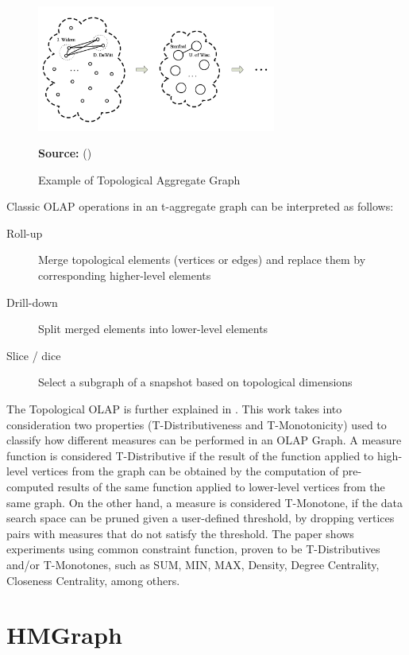 \begin{figure}[ht]
\centering
\caption{Example of Topological Aggregate Graph}
\label{fig:figure16}
\includegraphics[width=0.7\textwidth]{images/t_aggregated_graph_example.png}
\par\medskip\ABNTEXfontereduzida\selectfont\textbf{Source:} \citeauthor{Chen2008} (\citeyear{Chen2008}) \par\medskip
\end{figure}

Classic OLAP operations in an t-aggregate graph can be interpreted as follows:
\begin{description}
\item[Roll-up] Merge topological elements (vertices or edges) and replace them by corresponding higher-level elements
\item[Drill-down] Split merged elements into lower-level elements
\item[Slice / dice] Select a subgraph of a snapshot based on topological dimensions
\end{description}

The Topological OLAP is further explained in \cite{Qu2011}. This work takes into consideration two properties (T-Distributiveness and T-Monotonicity) used to classify how different measures can be performed in an OLAP Graph. A measure function is considered T-Distributive if the result of the function applied to high-level vertices from the graph can be obtained by the computation of pre-computed results of the same function applied to lower-level vertices from the same graph. On the other hand, a measure is considered T-Monotone, if the data search space can be pruned given a user-defined threshold, by dropping vertices pairs with measures that do not satisfy the threshold. The paper shows experiments using common constraint function, proven to be T-Distributives and/or T-Monotones, such as SUM, MIN, MAX, Density, Degree Centrality, Closeness Centrality, among others.

\section{HMGraph}

